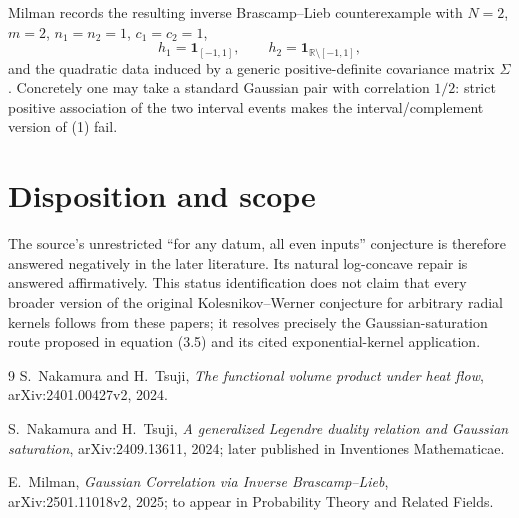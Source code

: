\documentclass[11pt]{article}
\begin{document}
Milman records the resulting inverse Brascamp--Lieb counterexample with
$N=2$, $m=2$, $n_1=n_2=1$, $c_1=c_2=1$,
\[
 h_1=\mathbf 1_{[-1,1]},\qquad
 h_2=\mathbf 1_{\mathbb R\setminus[-1,1]},
\]
and the quadratic data induced by a generic positive-definite covariance
matrix $\Sigma$.  Concretely one may take a standard Gaussian pair with
correlation $1/2$: strict positive association of the two interval events
makes the interval/complement version of (1) fail.

\section{Disposition and scope}

The source's unrestricted ``for any datum, all even inputs'' conjecture is
therefore answered negatively in the later literature.  Its natural
log-concave repair is answered affirmatively.  This status identification
does not claim that every broader version of the original
Kolesnikov--Werner conjecture for arbitrary radial kernels follows from
these papers; it resolves precisely the Gaussian-saturation route proposed
in equation (3.5) and its cited exponential-kernel application.

\begin{thebibliography}{9}
S.~Nakamura and H.~Tsuji,
\emph{The functional volume product under heat flow},
arXiv:2401.00427v2, 2024.

S.~Nakamura and H.~Tsuji,
\emph{A generalized Legendre duality relation and Gaussian saturation},
arXiv:2409.13611, 2024; later published in Inventiones Mathematicae.

E.~Milman,
\emph{Gaussian Correlation via Inverse Brascamp--Lieb},
arXiv:2501.11018v2, 2025; to appear in Probability Theory and Related Fields.
\end{thebibliography}
\end{document}
